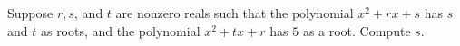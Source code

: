 Suppose $r, s$, and $t$ are nonzero reals such that the polynomial $x^{2}+r x+s$ has $s$ and $t$ as roots, and the polynomial $x^{2}+t x+r$ has $5$ as a root. Compute $s$.